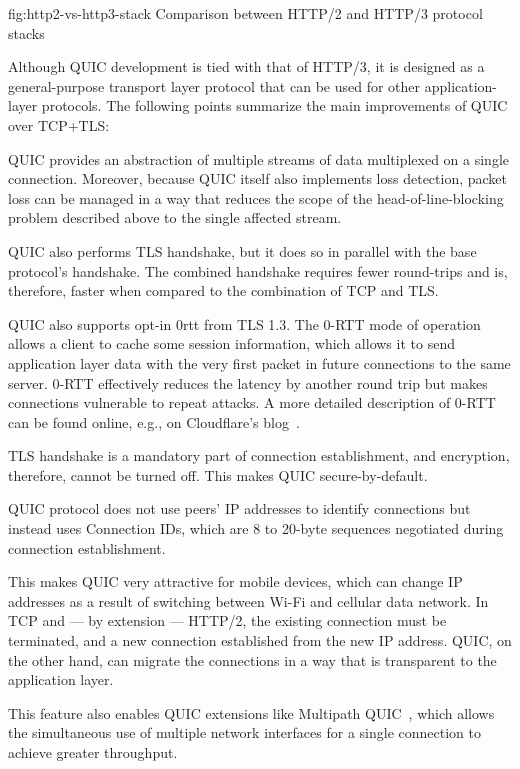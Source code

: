 \begin{myFigure}
  {fig:http2-vs-http3-stack}
  {Comparison between HTTP/2 and HTTP/3 protocol stacks}

  

\end{myFigure}

Although QUIC development is tied with that of HTTP/3, it is designed as a general-purpose transport
layer protocol that can be used for other application-layer protocols. The following points
summarize the main improvements of QUIC over TCP+TLS:

\begin{itemize}

     QUIC provides an abstraction of multiple streams of data multiplexed
    on a single connection. Moreover, because QUIC itself also implements loss detection, packet
    loss can be managed in a way that reduces the scope of the \gls{head-of-line-blocking} problem
    described above to the single affected stream.

     QUIC also performs TLS handshake, but it does so in
    parallel with the base protocol's handshake. The combined handshake requires fewer round-trips
    and is, therefore, faster when compared to the combination of TCP and TLS\@.

    QUIC also supports opt-in \gls{0rtt} from TLS 1.3. The 0-RTT mode of operation allows a
    client to cache some session information, which allows it to send application layer data with
    the very first packet in future connections to the same server.  0-RTT effectively reduces the
    latency by another round trip but makes connections vulnerable to repeat attacks. A more detailed
    description of 0-RTT can be found online, e.g., on Cloudflare's blog~\cite{cloudflare-0rtt}.

     TLS handshake is a mandatory part of connection establishment, and
    encryption, therefore, cannot be turned off. This makes QUIC secure-by-default.

     QUIC protocol does not use peers'
    IP addresses to identify connections but instead uses Connection IDs, which are 8 to 20-byte
    sequences negotiated during connection establishment.

    This makes QUIC very attractive for mobile devices, which can change IP addresses as a result of
    switching between Wi-Fi and cellular data network. In TCP and --- by extension --- HTTP/2, the
    existing connection must be terminated, and a new connection established from the new IP
    address. QUIC, on the other hand, can migrate the connections in a way that is transparent to
    the application layer.

    This feature also enables QUIC extensions like Multipath
    QUIC~\cite{draft-deconinck-quic-multipath-04}, which allows the simultaneous use of multiple
    network interfaces for a single connection to achieve greater throughput.

\end{itemize}

